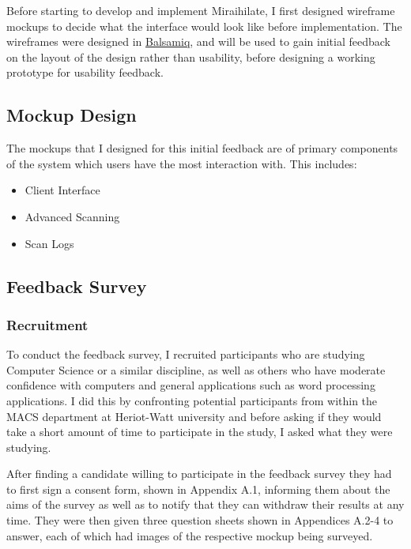Before starting to develop and implement Miraihilate, I first designed wireframe mockups to decide what the interface would look like before implementation. The wireframes were designed in \href{https://balsamiq.com}{Balsamiq}, and will be used to gain initial feedback on the layout of the design rather than usability, before designing a working prototype for usability feedback.

\subsection{Mockup Design}

The mockups that I designed for this initial feedback are of primary components of the system which users have the most interaction with. This includes:
\begin{itemize}
	\item{Client Interface}
	\item{Advanced Scanning}
	\item{Scan Logs}
\end{itemize}

\subsection{Feedback Survey}

\subsubsection{Recruitment}

To conduct the feedback survey, I recruited participants who are studying Computer Science or a similar discipline, as well as others who have moderate confidence with computers and general applications such as word processing applications. I did this by confronting potential participants from within the MACS department at Heriot-Watt university and before asking if they would take a short amount of time to participate in the study, I asked what they were studying.

\vspace{0.5cm}

After finding a candidate willing to participate in the feedback survey they had to first sign a consent form, shown in Appendix A.1, informing them about the aims of the survey as well as to notify that they can withdraw their results at any time. They were then given three question sheets shown in Appendices A.2-4 to answer, each of which had images of the respective mockup being surveyed.

